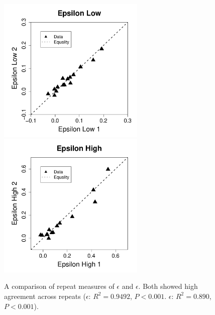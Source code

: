 \begin{figure}[htp]
\centering
\includegraphics[width=7cm]{./Figures/chapter5/figureLowReps}%
\hspace{0cm}%
\includegraphics[width=7cm]{./Figures/chapter5/figureHighReps} \\
\caption[A comparison of repeat measures of $\epsilon$ and $\epsilon$]{A comparison of repeat measures of $\epsilon$ and $\epsilon$. Both showed high agreement across repeats ($\epsilon$: $R^2 = 0.9492$, $P < 0.001$. $\epsilon$: $R^2 = 0.890$, $P < 0.001$).}
\label{appendixb/figure1}
\end{figure}

